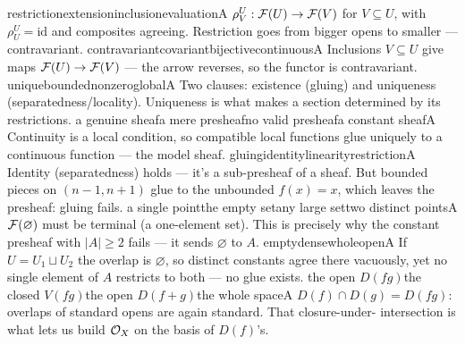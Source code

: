 \begin{quizlist}
  {restriction}{extension}{inclusion}{evaluation}{A}
  {$\rho^U_V:\mathcal{F}(U)\to\mathcal{F}(V)$ for $V\subseteq U$, with $\rho^U_U=\mathrm{id}$ and composites
   agreeing. Restriction goes from bigger opens to smaller --- contravariant.}
  {contravariant}{covariant}{bijective}{continuous}{A}
  {Inclusions $V\subseteq U$ give maps $\mathcal{F}(U)\to\mathcal{F}(V)$ --- the arrow reverses, so the functor is
   contravariant.}
  {unique}{bounded}{nonzero}{global}{A}
  {Two clauses: existence (gluing) and uniqueness (separatedness/locality). Uniqueness is what makes
   a section determined by its restrictions.}
  {a genuine sheaf}{a mere presheaf}{no valid presheaf}{a constant sheaf}{A}
  {Continuity is a local condition, so compatible local functions glue uniquely to a continuous
   function --- the model sheaf.}
  {gluing}{identity}{linearity}{restriction}{A}
  {Identity (separatedness) holds --- it's a sub-presheaf of a sheaf. But bounded pieces on
   $(n{-}1,n{+}1)$ glue to the unbounded $f(x)=x$, which leaves the presheaf: gluing fails.}
  {a single point}{the empty set}{any large set}{two distinct points}{A}
  {$\mathcal{F}(\varnothing)$ must be terminal (a one-element set). This is precisely why the constant
   presheaf with $|A|\ge2$ fails --- it sends $\varnothing$ to $A$.}
  {empty}{dense}{whole}{open}{A}
  {If $U=U_1\sqcup U_2$ the overlap is $\varnothing$, so distinct constants agree there vacuously,
   yet no single element of $A$ restricts to both --- no glue exists.}
  {the open $D(fg)$}{the closed $V(fg)$}{the open $D(f+g)$}{the whole space}{A}
  {$D(f)\cap D(g)=D(fg)$: overlaps of standard opens are again standard. That closure-under-%
   intersection is what lets us build $\mathcal{O}_X$ on the basis of $D(f)$'s.}
\end{quizlist}


